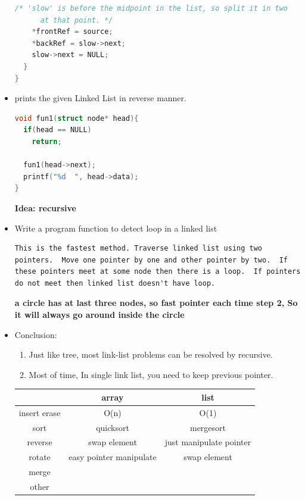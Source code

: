 \documentclass[a4paper,11pt,twoside]{book}
\begin{document}
\begin{itemize}
\begin{lstlisting}[frame=single, language=c++]
    /* 'slow' is before the midpoint in the list, so split it in two
      at that point. */
    *frontRef = source;
    *backRef = slow->next;
    slow->next = NULL;
  }
}

\end{lstlisting}


	\item prints the given Linked List in reverse manner. 
\begin{lstlisting}[frame=single, language=c++]
void fun1(struct node* head){
  if(head == NULL)
    return;
  
  fun1(head->next);
  printf("%d  ", head->data);
}
\end{lstlisting}
\textbf{Idea: recursive}


	\item Write a program function to detect loop in a linked list
\begin{lstlisting}[breaklines]
This is the fastest method. Traverse linked list using two pointers.  Move one pointer by one and other pointer by two.  If these pointers meet at some node then there is a loop.  If pointers do not meet then linked list doesn't have loop.
\end{lstlisting}
\textbf{a circle has at last three nodes, so fast pointer each time step 2, So it will always go around inside the circle}

	\item Conclusion:
\begin{enumerate}
\item Just like tree, most link-list problems can be resolved by recursive. 

\item Most of time, In single link list, you need to keep previous pointer. 
\end{enumerate}

\begin{tabular}{|c|c|c|}
\hline 
 & array & list \\ 
\hline 
insert erase & O(n) & O(1) \\ 
\hline 
sort & quicksort & mergesort  \\ 
\hline 
reverse & swap element & just manipulate pointer  \\ 
\hline 
rotate & easy pointer manipulate & swap element  \\ 
\hline 
merge &  &  \\ 
\hline 
other  &  &  \\ 
\hline 

\end{tabular} 


\end{itemize}
\end{document}
